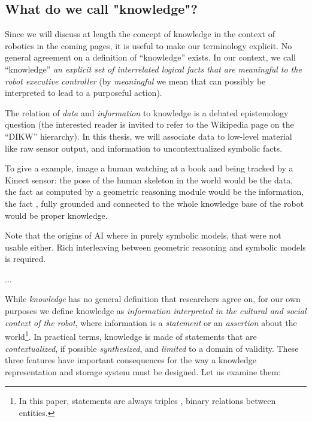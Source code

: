 
\subsection{What do we call "knowledge"?}
\label{sect|on-knowledge}


Since we will discuss at length the concept of knowledge in the context
of robotics in the coming pages, it is useful to make our terminology explicit.  No general
agreement on a definition of ``knowledge'' exists. In our context, we call
``knowledge'' \emph{an explicit set of interrelated logical facts that are
meaningful to the robot executive controller} (by \emph{meaningful} we mean
that can possibly be interpreted to lead to a purposeful action).

The relation of \emph{data} and \emph{information} to knowledge is a debated
epistemology question (the interested reader is invited to refer to the
Wikipedia page on the ``DIKW'' hierarchy). In this thesis, we will associate
data to low-level material like raw sensor output, and information to
uncontextualized symbolic facts.

To give a example, image a human watching at a book and being tracked by a
Kinect sensor: the pose of the human skeleton in the world would be the data,
the fact  as computed by a geometric reasoning
module would be the information, the fact , fully grounded and connected to the whole knowledge base of
the robot would be proper knowledge.

Note that the origins of AI where in purely symbolic models, that were
not usable either. Rich interleaving between geometric reasoning and symbolic
models is required.

...

While \emph{knowledge} has no general definition that researchers agree on, for
our own purposes we define knowledge as \emph{information interpreted in the
cultural and social context of the robot}, where information is a
\emph{statement} or an \emph{assertion} about the world\footnote{In this paper,
statements are always triples , \ie binary
relations between entities.}. In practical terms, knowledge is made of
statements that are \emph{contextualized}, if possible \emph{synthesized}, and
\emph{limited} to a domain of validity. These three features have important 
consequences for the way a knowledge representation and storage system must 
be designed. Let us examine them:

